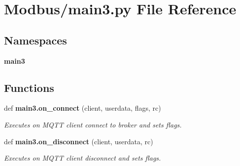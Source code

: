 \section{Modbus/main3.py File Reference}
\label{main3_8py}
\subsection*{Namespaces}
\begin{DoxyCompactItemize}
\item 
 \textbf{ main3}
\end{DoxyCompactItemize}
\subsection*{Functions}
\begin{DoxyCompactItemize}
\item 
def \textbf{ main3.\+on\+\_\+connect} (client, userdata, flags, rc)
\begin{DoxyCompactList}\small\item\em Executes on M\+Q\+TT client connect to broker and sets flags. \end{DoxyCompactList}\item 
def \textbf{ main3.\+on\+\_\+disconnect} (client, userdata, rc)
\begin{DoxyCompactList}\small\item\em Executes on M\+Q\+TT client disconnect and sets flags. \end{DoxyCompactList}\end{DoxyCompactItemize}
